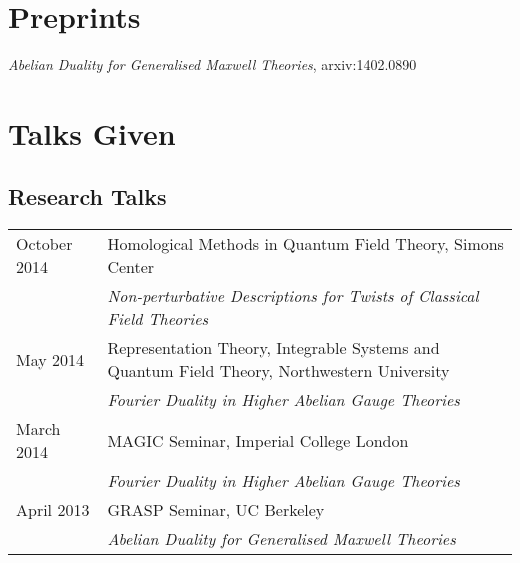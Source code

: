 \documentclass[10pt,oneside]{article}
\newcommand\T{\rule{0pt}{2.6ex}}
\begin{document}
\section*{Preprints}
\emph{Abelian Duality for Generalised Maxwell Theories}, arxiv:1402.0890

\section*{Talks Given}
\subsection*{Research Talks}
\begin{tabular}{ll}
October 2014 \T & Homological Methods in Quantum Field Theory, Simons Center \\
& \emph{Non-perturbative Descriptions for Twists of Classical Field Theories} \\
May 2014 \T & Representation Theory, Integrable Systems and Quantum Field Theory, Northwestern University \\
& \emph{Fourier Duality in Higher Abelian Gauge Theories} \\
March 2014 \T & MAGIC Seminar, Imperial College London \\
& \emph{Fourier Duality in Higher Abelian Gauge Theories} \\
April 2013 \T & GRASP Seminar, UC Berkeley \\
& \emph{Abelian Duality for Generalised Maxwell Theories}  
\end{tabular}
\end{document}
